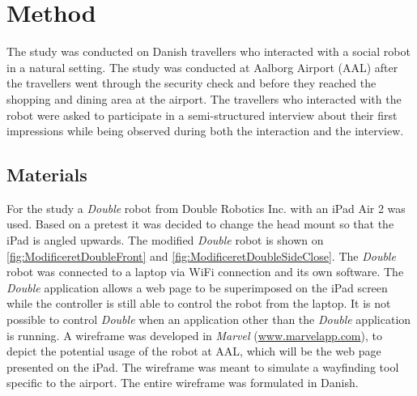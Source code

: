 \section{Method}
\label{Method}
%
The study was conducted on Danish travellers who interacted with a social robot in a natural setting.  The study was conducted at Aalborg Airport (AAL) after the travellers went through the security check and before they reached the shopping and dining area at the airport. The travellers who interacted with the robot were asked to participate in a semi-structured interview about their first impressions while being observed during both the interaction and the interview. 

\subsection{Materials}
For the study a \textit{Double} robot from Double Robotics Inc. with an iPad Air 2 was used. Based on a pretest it was decided to change the head mount so that the iPad is angled upwards. The modified \textit{Double} robot is shown on \autoref{fig:ModificeretDoubleFront} and \autoref{fig:ModificeretDoubleSideClose}. The \textit{Double} robot was connected to a laptop via WiFi connection and its own software. The \textit{Double} application allows a web page to be superimposed on the iPad screen while the controller is still able to control the robot from the laptop. It is not possible to control \textit{Double} when an application other than the \textit{Double} application is running. A wireframe was developed in \textit{Marvel} (\url{www.marvelapp.com}), to depict the potential usage of the robot at AAL, which will be the web page presented on the iPad. The wireframe was meant to simulate a wayfinding tool specific to the airport. The entire wireframe was formulated in Danish.


